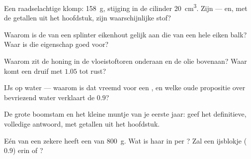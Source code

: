 \begin{exercise}[$\star$]\label{exo:g6:density-floating:4}
Een raadselachtige klomp:  \qty{158}{g}, stijging in de cilinder
\qty{20}{cm^3}. Zijn  --- en, met de getallen uit het
hoofdstuk, zijn waarschijnlijke stof?
\end{exercise}

\begin{exercise}[$\star$]\label{exo:g6:density-floating:5}
Waarom is de  van een splinter eikenhout gelijk aan die van
een hele eiken balk? Waar is die eigenschap goed voor?
\end{exercise}

\begin{exercise}[$\star$]\label{exo:g6:density-floating:6}
Waarom zit de honing in de vloeistoftoren onderaan en de olie
bovenaan? Waar komt een druif met  $1.05$ tot rust?
\end{exercise}

\begin{exercise}[$\star$]\label{exo:g6:density-floating:7}
IJs  op water --- waarom is dat vreemd voor een
, en welke oude propositie over bevriezend water verklaart
de $0.9$?
\end{exercise}

\begin{exercise}[$\star$]\label{exo:g6:density-floating:8}
De grote boomstam en het kleine muntje van je eerste jaar: geef het
definitieve, volledige antwoord, met getallen uit het hoofdstuk.
\end{exercise}

\begin{exercise}[$\star\star$]\label{exo:g6:density-floating:9}
Eén  van een zekere  heeft een  van
\qty{800}{g}. Wat is haar  in  per
? Zal een ijsblokje ($0.9$) erin  of
?
\end{exercise}

